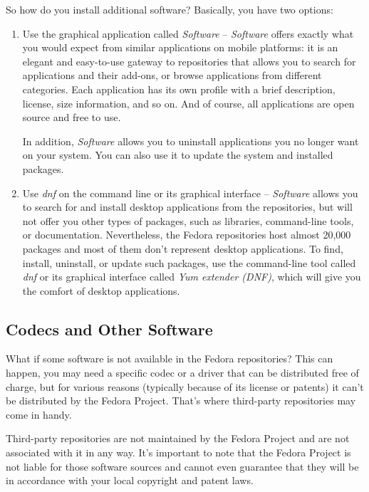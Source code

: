 So how do you install additional software? Basically, you have two options:
\begin{enumerate}
\item Use the graphical application called \emph{Software} -- \emph{Software} offers exactly what you would expect from similar applications on mobile platforms: it is an elegant and easy-to-use gateway to repositories that allows you to search for applications and their add-ons, or browse applications from different categories. Each application has its own profile with a brief description, license, size information, and so on. And of course, all applications are open source and free to use.

In addition, \emph{Software} allows you to uninstall applications you no longer want on your system. You can also use it to update the system and installed packages.


\item Use \emph{dnf} on the command line or its graphical interface -- \emph{Software} allows you to search for and install desktop applications from the repositories, but will not offer you other types of packages, such as libraries, command-line tools, or documentation. Nevertheless, the Fedora repositories host almost 20,000 packages and most of them don't represent desktop applications. To find, install, uninstall, or update such packages, use the command-line tool called \emph{dnf} or its graphical interface called \emph{Yum extender (DNF)}, which will give you the comfort of desktop applications.
\end{enumerate}

\subsection*{Codecs and Other Software}

What if some software is not available in the Fedora repositories? This can happen, you may need a specific codec or a driver that can be distributed free of charge, but for various reasons (typically because of its license or patents) it can't be distributed by the Fedora Project. That's where third-party repositories may come in handy.

Third-party repositories are not maintained by the Fedora Project and are not associated with it in any way. It's important to note that the Fedora Project is not liable for those software sources and cannot even guarantee that they will be in accordance with your local copyright and patent laws.

